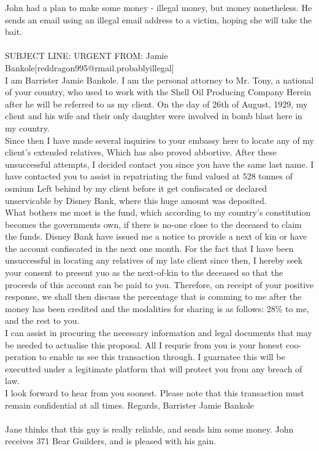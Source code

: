\documentclass{article}
\begin{document}
John had a plan to make some money {-} illegal money, but money nonetheless.
He sends an email using an illegal email address to a victim, hoping she will take the bait.
\\\\
SUBJECT LINE: URGENT
FROM: Jamie Bankole[reddragon995@rmail.probablyillegal]
\\
I am Barrister Jamie Bankole.
I am the personal attorney to Mr. Tony, a national of your country, who used to work with the Shell Oil Producing Company
Herein after he will be referred to as my client.
On the day of 26th of August, 1929, my client and his wife and their only daughter were involved in bomb blast here in my country.
\\
Since then I have made several inquiries to your embassy here to locate any of my client's extended relatives, Which has also proved abbortive.
After these unsuccessful attempts, I decided contact you since you have the same last name.
I have contacted you to assist in repatriating the fund valued at 528 tonnes of osmium Left behind by my client before it get confiscated or declared unservicable by Disney Bank, where this huge amount was deposited.
\\
What bothers me most is the fund, which according to my country's constitution becomes the governments own, if there is no{-}one close to the deceased to claim the funds.
Disney Bank have issued me a notice to provide a next of kin or have the account confiscated in the next one month.
For the fact that I have been unsuccessful in locating any relatives of my late client since then, I hereby seek your consent to present yuo as the next{-}of{-}kin to the deceased so that the proceeds of this account can be paid to you.
Therefore, on receipt of your positive response, we shall then discuss the percentage that is comming to me after the money has been credited and the modalities for sharing is as follows: 28\% to me, and the rest to you.
\\
I can assist in procuring the necessary information and legal documents that may be needed to actualise this proposal.
All I requrie from you is your honest coo{-}peration to enable us see this transaction through.
I guarnatee this will be executted under a legitimate platform that will protect you from any breach of law.
\\
I look forward to hear from you soonest.
Please note that this transaction must remain confidential at all times.
Regards, Barrister Jamie Bankole
\\\\
Jane thinks that this guy is really reliable, and sends him some money.
John receives 371 Bear Guilders, and is pleased with his gain.
\end{document}
